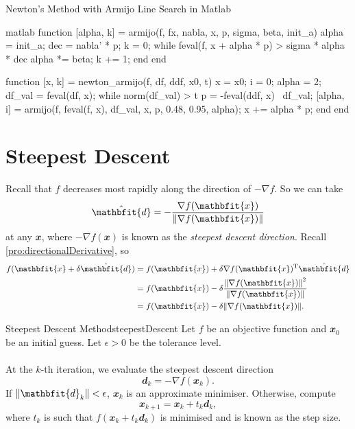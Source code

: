 \documentclass[math, code]{amznotes}
\theoremstyle{remark}
\begin{document}
\begin{codebox}{Newton's Method with Armijo Line Search in Matlab}{}
    \begin{amzcode}{matlab}
function [alpha, k] = armijo(f, fx, nabla, x, p, sigma, beta, init_a)
    alpha = init_a;
    dec = nabla' * p;
    k = 0;
    while feval(f, x + alpha * p) > sigma * alpha * dec 
        alpha *= beta;
        k += 1;
    end
end

function [x, k] = newton_armijo(f, df, ddf, x0, t)
    x = x0;
    i = 0;
    alpha = 2;
    df_val = feval(df, x);
    while norm(df_val) > t
        p = -feval(ddf, x) \ df_val;
        [alpha, i] = armijo(f, feval(f, x), df_val, x, p, 0.48, 0.95, alpha);
        x += alpha * p;
    end
end
    \end{amzcode}
\end{codebox}
\section{Steepest Descent}
Recall that $f$ decreases most rapidly along the direction of $-\nabla f$. So we can take
\begin{equation*}
    \hat{\mathbfit{d}} = -\frac{\nabla f(\mathbfit{x})}{\norm{\nabla f(\mathbfit{x})}}
\end{equation*}
at any $\mathbfit{x}$, where $-\nabla f(\mathbfit{x})$ is known as the \textit{steepest descent direction}. Recall \ref{pro:directionalDerivative}, so 
\begin{align*}
    f(\mathbfit{x} + \delta\hat{\mathbfit{d}}) & = f(\mathbfit{x}) + \delta\nabla f(\mathbfit{x})^{\mathrm{T}}\hat{\mathbfit{d}} \\
    & = f(\mathbfit{x}) - \delta\frac{\norm{\nabla f(\mathbfit{x})}^2}{\norm{\nabla f(\mathbfit{x})}} \\
    & = f(\mathbfit{x}) - \delta\norm{\nabla f(\mathbfit{x})}.
\end{align*}
\begin{tecbox}{Steepest Descent Method}{steepestDescent}
    Let $f$ be an objective function and $\mathbfit{x}_0$ be an initial guess. Let $\epsilon > 0$ be the tolerance level.
    \\\\
    At the $k$-th iteration, we evaluate the steepest descent direction
    \begin{equation*}
        \mathbfit{d}_k = -\nabla f\left(\mathbfit{x}_k\right).
    \end{equation*}
    If $\norm{\mathbfit{d}_k} < \epsilon$, $\mathbfit{x}_k$ is an approximate minimiser. Otherwise, compute
    \begin{equation*}
        \mathbfit{x}_{k + 1} = \mathbfit{x}_k + t_k\mathbfit{d}_k,
    \end{equation*}
    where $t_k$ is such that $f(\mathbfit{x}_k + t_k\mathbfit{d}_k)$ is minimised and is known as the step size.
\end{tecbox}
\end{document}
